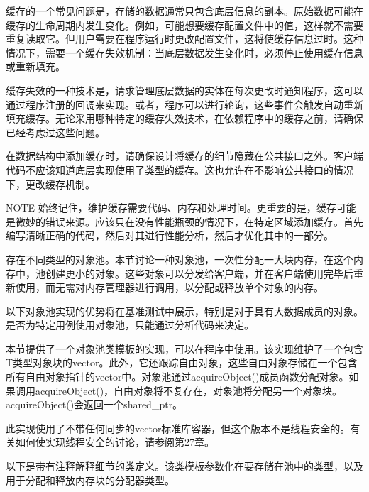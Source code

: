 缓存的一个常见问题是，存储的数据通常只包含底层信息的副本。原始数据可能在缓存的生命周期内发生变化。例如，可能想要缓存配置文件中的值，这样就不需要重复读取它。但用户需要在程序运行时更改配置文件，这将使缓存信息过时。这种情况下，需要一个缓存失效机制：当底层数据发生变化时，必须停止使用缓存信息或重新填充。

缓存失效的一种技术是，请求管理底层数据的实体在每次更改时通知程序，这可以通过程序注册的回调来实现。或者，程序可以进行轮询，这些事件会触发自动重新填充缓存。无论采用哪种特定的缓存失效技术，在依赖程序中的缓存之前，请确保已经考虑过这些问题。

在数据结构中添加缓存时，请确保设计将缓存的细节隐藏在公共接口之外。客户端代码不应该知道底层实现使用了类型的缓存。这也允许在不影响公共接口的情况下，更改缓存机制。

\begin{myNotic}{NOTE}
始终记住，维护缓存需要代码、内存和处理时间。更重要的是，缓存可能是微妙的错误来源。应该只在没有性能瓶颈的情况下，在特定区域添加缓存。首先编写清晰正确的代码，然后对其进行性能分析，然后才优化其中的一部分。
\end{myNotic}


存在不同类型的对象池。本节讨论一种对象池，一次性分配一大块内存，在这个内存中，池创建更小的对象。这些对象可以分发给客户端，并在客户端使用完毕后重新使用，而无需对内存管理器进行调用，以分配或释放单个对象的内存。

以下对象池实现的优势将在基准测试中展示，特别是对于具有大数据成员的对象。是否为特定用例使用对象池，只能通过分析代码来决定。


本节提供了一个对象池类模板的实现，可以在程序中使用。该实现维护了一个包含T类型对象块的vector。此外，它还跟踪自由对象，这些自由对象存储在一个包含所有自由对象指针的vector中。对象池通过acquireObject()成员函数分配对象。如果调用acquireObject()，自由对象将不复存在，对象池将分配另一个对象块。acquireObject()会返回一个shared\_ptr。

此实现使用了不带任何同步的vector标准库容器，但这个版本不是线程安全的。有关如何使实现线程安全的讨论，请参阅第27章。

以下是带有注释解释细节的类定义。该类模板参数化在要存储在池中的类型，以及用于分配和释放内存块的分配器类型。

